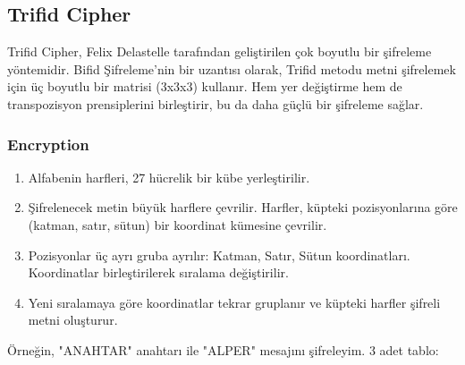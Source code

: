 \newpage

\subsection{Trifid Cipher}

Trifid Cipher, Felix Delastelle tarafından geliştirilen çok boyutlu bir şifreleme yöntemidir. Bifid Şifreleme'nin bir uzantısı olarak, Trifid metodu metni şifrelemek için üç boyutlu bir matrisi (3x3x3) kullanır. Hem yer değiştirme hem de transpozisyon prensiplerini birleştirir, bu da daha güçlü bir şifreleme sağlar.

\subsubsection{Encryption}

\begin{enumerate}
    \item Alfabenin harfleri, 27 hücrelik bir kübe yerleştirilir.
    \item Şifrelenecek metin büyük harflere çevrilir. Harfler, küpteki pozisyonlarına göre (katman, satır, sütun) bir koordinat kümesine çevrilir.
    \item Pozisyonlar üç ayrı gruba ayrılır: Katman, Satır, Sütun koordinatları. Koordinatlar birleştirilerek sıralama değiştirilir.
    \item Yeni sıralamaya göre koordinatlar tekrar gruplanır ve küpteki harfler şifreli metni oluşturur.
\end{enumerate}

Örneğin, "ANAHTAR" anahtarı ile "ALPER" mesajını şifreleyim. 3 adet tablo:

\begin{table}[ht]
\centering
{}
\end{table}

\begin{table}[ht]
\centering
{}
\end{table}

